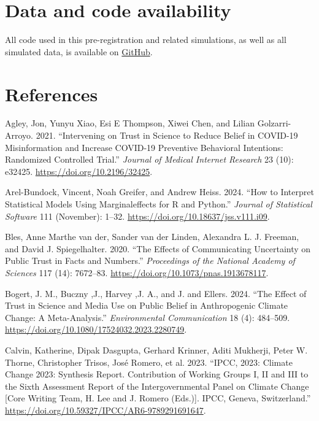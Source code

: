 \documentclass[
  letterpaper,
  DIV=11,
  numbers=noendperiod]{scrartcl}
\newlength{\cslhangindent}
\newenvironment{CSLReferences}[2] %
 {\begin{list}{}{%
  \setlength{\itemindent}{0pt}
  \setlength{\leftmargin}{0pt}
  \setlength{\parsep}{0pt}
  \ifodd #1
   \setlength{\leftmargin}{\cslhangindent}
   \setlength{\itemindent}{-1\cslhangindent}
  \fi
  \setlength{\itemsep}{#2\baselineskip}}}
 {\end{list}}
\begin{document}
\section{Data and code availability}\label{data-and-code-availability}

All code used in this pre-registration and related simulations, as well
as all simulated data, is available on
{\href{https://github.com/janpfander/trust_climate_scientists/tree/main}{
GitHub}}.

\clearpage

\section{References}\label{references}

\label{refs}
\begin{CSLReferences}{1}{0}
Agley, Jon, Yunyu Xiao, Esi E Thompson, Xiwei Chen, and Lilian
Golzarri-Arroyo. 2021. {``Intervening on Trust in Science to Reduce
Belief in COVID-19 Misinformation and Increase COVID-19 Preventive
Behavioral Intentions: Randomized Controlled Trial.''} \emph{Journal of
Medical Internet Research} 23 (10): e32425.
\url{https://doi.org/10.2196/32425}.

Arel-Bundock, Vincent, Noah Greifer, and Andrew Heiss. 2024. {``How to
Interpret Statistical Models Using Marginaleffects for R and Python.''}
\emph{Journal of Statistical Software} 111 (November): 1--32.
\url{https://doi.org/10.18637/jss.v111.i09}.

Bles, Anne Marthe van der, Sander van der Linden, Alexandra L. J.
Freeman, and David J. Spiegelhalter. 2020. {``The Effects of
Communicating Uncertainty on Public Trust in Facts and Numbers.''}
\emph{Proceedings of the National Academy of Sciences} 117 (14):
7672--83. \url{https://doi.org/10.1073/pnas.1913678117}.

Bogert, J. M., Buczny ,J., Harvey ,J. A., and J. and Ellers. 2024.
{``The Effect of Trust in Science and Media Use on Public Belief in
Anthropogenic Climate Change: A Meta-Analysis.''} \emph{Environmental
Communication} 18 (4): 484--509.
\url{https://doi.org/10.1080/17524032.2023.2280749}.

Calvin, Katherine, Dipak Dasgupta, Gerhard Krinner, Aditi Mukherji,
Peter W. Thorne, Christopher Trisos, José Romero, et al. 2023. {``IPCC,
2023: Climate Change 2023: Synthesis Report. Contribution of Working
Groups I, II and III to the Sixth Assessment Report of the
Intergovernmental Panel on Climate Change {[}Core Writing Team, H. Lee
and J. Romero (Eds.){]}. IPCC, Geneva, Switzerland.''}
\url{https://doi.org/10.59327/IPCC/AR6-9789291691647}.


\end{CSLReferences}
\end{document}
